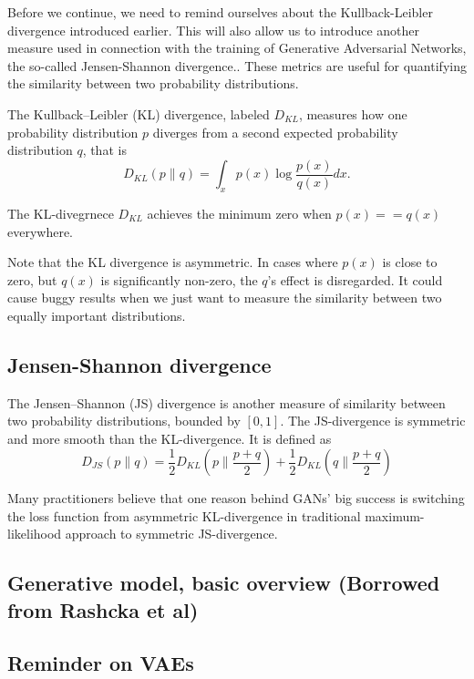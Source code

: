 \documentclass[%
oneside,                 %
final,                   %
10pt]{article}
\begin{document}
Before we continue, we need to remind ourselves about the
Kullback-Leibler divergence introduced earlier. This will also allow
us to introduce another measure used in connection with the training
of Generative Adversarial Networks, the so-called Jensen-Shannon divergence..
These metrics are useful for quantifying the similarity between two probability distributions.

The Kullback–Leibler (KL) divergence, labeled $D_{KL}$,   measures how one probability distribution $p$ diverges from a second expected probability distribution $q$,
that is
\[
D_{KL}(p \| q) = \int_x p(x) \log \frac{p(x)}{q(x)} dx.
\]

The KL-divegrnece $D_{KL}$ achieves the minimum zero when $p(x) == q(x)$ everywhere.

Note that the KL divergence is asymmetric. In cases where $p(x)$ is
close to zero, but $q(x)$ is significantly non-zero, the $q$'s effect
is disregarded. It could cause buggy results when we just want to
measure the similarity between two equally important distributions.

\subsection{Jensen-Shannon divergence}

The Jensen–Shannon (JS) divergence is another measure of similarity between
two probability distributions, bounded by $[0, 1]$. The JS-divergence is
symmetric and more smooth than the KL-divergence.
It is defined as
\[
D_{JS}(p \| q) = \frac{1}{2} D_{KL}(p \| \frac{p + q}{2}) + \frac{1}{2} D_{KL}(q \| \frac{p + q}{2})
\]

Many practitioners believe that one reason behind GANs' big success is
switching the loss function from asymmetric KL-divergence in
traditional maximum-likelihood approach to symmetric JS-divergence.

\subsection{Generative model,  basic overview (Borrowed from Rashcka et al)}


\subsection{Reminder on VAEs}
\end{document}

